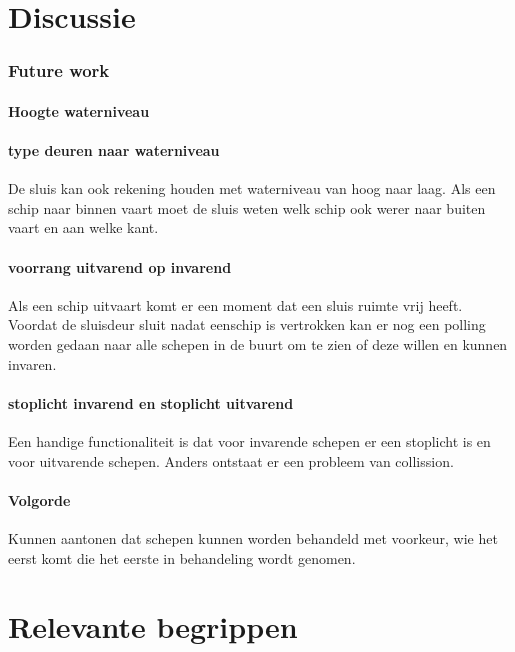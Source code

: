 			
			
			
			\chapter{Discussie}
			
			\subsection{Future work}
			\subsubsection{Hoogte waterniveau}
			
			\subsubsection{type deuren naar waterniveau}
			De sluis kan ook rekening houden met waterniveau van hoog naar laag.
			Als een schip naar binnen vaart moet de sluis weten welk schip ook werer naar buiten vaart en aan welke kant.
			
			\subsubsection{voorrang uitvarend op invarend}
			Als een schip uitvaart komt er een moment dat een sluis ruimte vrij heeft. Voordat de sluisdeur sluit nadat eenschip is vertrokken kan er nog een polling worden gedaan naar alle schepen in de buurt om te zien of deze willen en kunnen invaren.
			
			\subsubsection{stoplicht invarend en stoplicht uitvarend}
			Een handige functionaliteit is dat voor invarende schepen er een stoplicht is en voor uitvarende schepen. Anders ontstaat er een probleem van collission. 
			
			\subsubsection{Volgorde}
			Kunnen aantonen dat schepen kunnen worden behandeld met voorkeur, wie het eerst komt die het eerste in behandeling wordt genomen.
			
			\chapter{Relevante begrippen}
			
